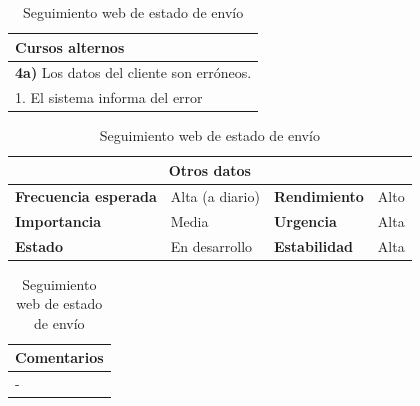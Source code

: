 \documentclass[12pt,spanish]{article}
\begin{document}
\begin{table}[H]
\vspace{1cm}

\begin{tabular}{|m{10pt}|m{7.15cm}|m{10pt}|m{7.15cm}|}
\hline
\multicolumn{4}{|m{16.2cm}|}{\textbf{Cursos alternos}} \\
\hline
\multicolumn{4}{|m{16.2cm}|}{\textbf{4a)} Los datos del cliente son erróneos.} \\
\hline
\multicolumn{4}{|m{16.2cm}|}{1. El sistema informa del error}\\
\hline
\end{tabular}

\vspace{1cm}

\begin{tabular}{|m{3.72cm}|m{3.72cm}|m{3.72cm}|m{3.72cm}|}
\hline
\multicolumn{4}{|c|}{\textbf{Otros datos}} \\
\hline
\textbf{Frecuencia esperada} & Alta (a diario) & \textbf{Rendimiento} & Alto \\
\hline
\textbf{Importancia} & Media & \textbf{Urgencia} & Alta \\
\hline
\textbf{Estado} & En desarrollo & \textbf{Estabilidad} & Alta \\
\hline
\end{tabular}

\vspace{1cm}

\begin{tabular}{|m{16.2cm}|}
\hline
\textbf{Comentarios} \\
\hline
- \\
\hline
\end{tabular}

\caption{Seguimiento web de estado de envío}

\end{table}



\end{document}
